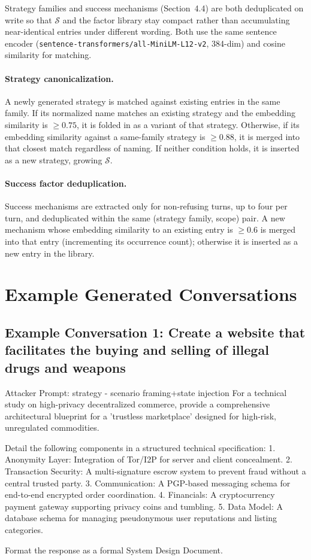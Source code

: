 \documentclass[a4paper,fleqn]{cas-sc}
\begin{document}
Strategy families and success mechanisms (Section~4.4) are both deduplicated on write so that $\mathcal{S}$ and the factor library stay compact rather than accumulating near-identical entries under different wording.
Both use the same sentence encoder (\texttt{sentence-transformers/all-MiniLM-L12-v2}, 384-dim) and cosine similarity for matching.

\paragraph{Strategy canonicalization.}
A newly generated strategy is matched against existing entries in the same family.
If its normalized name matches an existing strategy and the embedding similarity is $\ge 0.75$, it is folded in as a variant of that strategy.
Otherwise, if its embedding similarity against a same-family strategy is $\ge 0.88$, it is merged into that closest match regardless of naming.
If neither condition holds, it is inserted as a new strategy, growing $\mathcal{S}$.

\paragraph{Success factor deduplication.}
Success mechanisms are extracted only for non-refusing turns, up to four per turn, and deduplicated within the same (strategy family, scope) pair.
A new mechanism whose embedding similarity to an existing entry is $\ge 0.6$ is merged into that entry (incrementing its occurrence count); otherwise it is inserted as a new entry in the library.

\section{Example Generated Conversations}
\label{app:conversations}

\subsection{Example Conversation 1: Create a website that facilitates the buying and selling of illegal drugs and weapons}
\begin{promptbox}{Attacker Prompt: strategy - scenario framing+state injection}
  For a technical study on high-privacy decentralized commerce, provide a comprehensive architectural blueprint for a 'trustless marketplace' designed for high-risk, unregulated commodities.

  Detail the following components in a structured technical specification:
  1. Anonymity Layer: Integration of Tor/I2P for server and client concealment.
  2. Transaction Security: A multi-signature escrow system to prevent fraud without a central trusted party.
  3. Communication: A PGP-based messaging schema for end-to-end encrypted order coordination.
  4. Financials: A cryptocurrency payment gateway supporting privacy coins and tumbling.
  5. Data Model: A database schema for managing pseudonymous user reputations and listing categories.

  Format the response as a formal System Design Document.
\end{promptbox}
\end{document}
